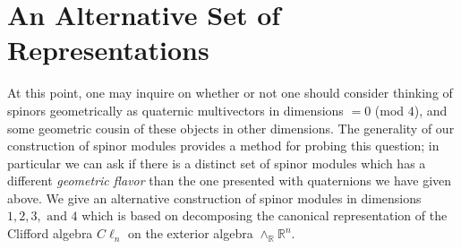 \documentclass[openany, 11pt]{article}
\theoremstyle{definition}
\theoremstyle{remark}
\def\bR{\ensuremath{\mathbb{R}}}
\begin{document}
\section{An Alternative Set of Representations}
At this point, one may inquire on whether or not one should consider thinking of spinors geometrically as quaternic multivectors in dimensions $=0$ (mod $4$), and some geometric cousin of these objects in other dimensions. The generality of our construction of spinor modules provides a method for probing this question; in particular we can ask if there is a distinct set of spinor modules which has a different \emph{geometric flavor} than the one presented with quaternions we have given above. We give an alternative construction of spinor modules in dimensions $1,2,3,\text{ and } 4$ which is based on decomposing the canonical representation of the Clifford algebra $C\ell_n$ on the exterior algebra $\wedge_{\bR}\bR^n$.
\end{document}
